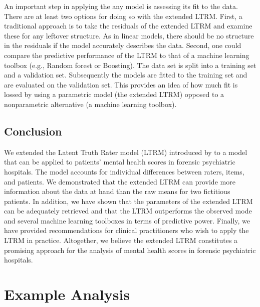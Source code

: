 \documentclass[a4paper,usenames,dvipsnames]{article}
\newenvironment{revision}{\color{teal}}{\color{black}}
\begin{document}
\begin{revision}
An important step in applying the any model is assessing its fit to the data.
There are at least two options for doing so with the extended LTRM.
First, a traditional approach is to take the residuals of the extended LTRM and examine these for any leftover structure.
As in linear models, there should be no structure in the residuals if the model accurately describes the data.
Second, one could compare the predictive performance of the LTRM to that of a machine learning toolbox (e.g., Random forest or Boosting).
The data set is split into a training set and a validation set. Subsequently the models are fitted to the training set and are evaluated on the validation set.
This provides an idea of how much fit is lossed by using a parametric model (the extended LTRM) opposed to a nonparametric alternative (a machine learning toolbox).
\end{revision}

\subsection*{Conclusion}
We extended the Latent Truth Rater model (LTRM) introduced by  to a model that can be applied to patients' mental health scores in forensic psychiatric hospitals. The model accounts for individual differences between raters, items, and patients. We demonstrated that the extended LTRM can provide more information about the data at hand than the raw means for two fictitious patients. In addition, we have shown that the parameters of the extended LTRM can be adequately retrieved and that the LTRM outperforms the observed mode and several machine learning toolboxes in terms of predictive power. Finally, we have provided recommendations for clinical practitioners who wish to apply the LTRM in practice. \begin{revision}Altogether, we believe the extended LTRM constitutes a promising approach for the analysis of mental health scores in forensic psychiatric hospitals.\end{revision}





\newpage
\appendix
{}

\section{Example Analysis}
\end{document}
